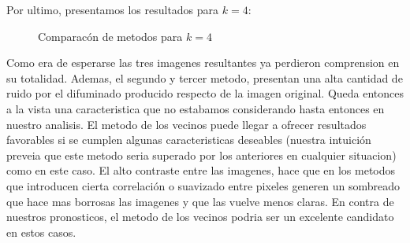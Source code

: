Por ultimo, presentamos los resultados para $k=4$:

\begin{figure}[H]
    \centering
    \qquad
    \qquad
    \caption{Comparacón de metodos para $k = 4$}
    \label{fig:example}
\end{figure}

Como era de esperarse las tres imagenes resultantes ya perdieron comprension en su totalidad. Ademas, el segundo y tercer metodo, presentan una alta cantidad de ruido por el difuminado producido respecto de la imagen original.
Queda entonces a la vista una caracteristica que no estabamos considerando hasta entonces en nuestro analisis. El metodo de los vecinos puede llegar a ofrecer resultados favorables si se cumplen algunas caracteristicas deseables (nuestra intuición preveia que este metodo seria superado por los anteriores en cualquier situacion) como en este caso. El alto contraste entre las imagenes, hace que en los metodos que introducen cierta correlación o suavizado entre pixeles generen un sombreado que hace mas borrosas las imagenes y que las vuelve menos claras. En contra de nuestros pronosticos, el metodo de los vecinos podria ser un excelente candidato en estos casos.


